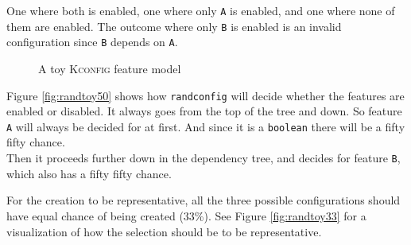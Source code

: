 \documentclass[a4paper,11pt]{report}
\newcommand{\figa}{
    \begin{figure}[!htpb]
    \centering
}
\newcommand{\figb}[2]{
    \caption{#1}
    \label{#2}
    \end{figure}
}
\begin{document}
One where both is enabled, one where only \texttt{A} is enabled, and one where 
none of them are enabled. The outcome where only \texttt{B} is enabled is an 
invalid configuration since \texttt{B} depends on \texttt{A}.

\figa
    \subfigure{
        
    }
\figb{A toy \textsc{Kconfig} feature model}{randconfigtoy}

Figure \ref{fig:randtoy50} shows how \texttt{randconfig} will decide whether 
the features are enabled or disabled. It always goes from the top of the tree 
and down. So feature \texttt{A} will always be decided for at first. And since 
it is a \texttt{boolean} there will be a fifty fifty chance.
\\

Then it proceeds further down in the dependency tree, and decides for feature
\texttt{B}, which also has a fifty fifty chance.

For the creation to be representative, all the three possible configurations 
should have equal chance of being created (33\%). See Figure 
\ref{fig:randtoy33} for a visualization of how the selection should 
be to be representative.
\end{document}
